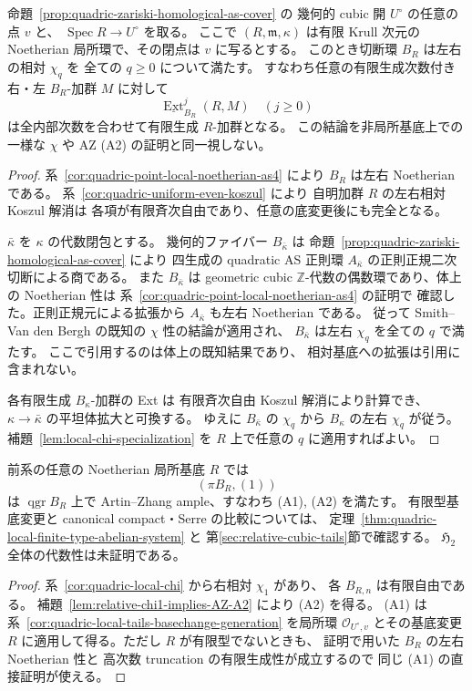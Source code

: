 \begin{corollary}
\label{cor:quadric-local-chi}
命題~\ref{prop:quadric-zariski-homological-as-cover} の
幾何的 cubic 開 $U^\circ$ の任意の点 $v$ と、
$\operatorname{Spec}R\to U^\circ$ を取る。
ここで $(R,\mathfrak m,\kappa)$ は有限 Krull 次元の
Noetherian 局所環で、その閉点は $v$ に写るとする。
このとき切断環 $B_R$ は左右の相対 $\chi_q$ を
全ての $q\ge0$ について満たす。
すなわち任意の有限生成次数付き右・左 $B_R$-加群
$M$ に対して
\[
 \underline{\operatorname{Ext}}_{B_R}^j(R,M)
 \quad(j\ge0)
\]
は全内部次数を合わせて有限生成 $R$-加群となる。
この結論を非局所基底上での一様な
$\chi$ や AZ (A2) の証明と同一視しない。
\end{corollary}
\begin{proof}
系~\ref{cor:quadric-point-local-noetherian-as4} により
$B_R$ は左右 Noetherian である。
系~\ref{cor:quadric-uniform-even-koszul} により
自明加群 $R$ の左右相対 Koszul 解消は
各項が有限斉次自由であり、任意の底変更後にも完全となる。

$\bar\kappa$ を $\kappa$ の代数閉包とする。
幾何的ファイバー $B_{\bar\kappa}$ は
命題~\ref{prop:quadric-zariski-homological-as-cover} により
四生成の quadratic AS 正則環
$A_{\bar\kappa}$ の正則正規二次切断による商である。
また $B_{\bar\kappa}$ は geometric cubic
$\mathbb Z$-代数の偶数環であり、体上の Noetherian 性は
系~\ref{cor:quadric-point-local-noetherian-as4} の証明で
確認した。正則正規元による拡張から
$A_{\bar\kappa}$ も左右 Noetherian である。
従って Smith--Van den Bergh
\cite[\S2.8]{SVdB2013}
の既知の $\chi$ 性の結論が適用され、
$B_{\bar\kappa}$ は左右 $\chi_q$ を全ての $q$ で満たす。
ここで引用するのは体上の既知結果であり、
相対基底への拡張は引用に含まれない。

各有限生成 $B_\kappa$-加群の Ext は
有限斉次自由 Koszul 解消により計算でき、
$\kappa\to\bar\kappa$ の平坦体拡大と可換する。
ゆえに $B_{\bar\kappa}$ の $\chi_q$ から
$B_\kappa$ の左右 $\chi_q$ が従う。
補題~\ref{lem:local-chi-specialization} を
$R$ 上で任意の $q$ に適用すればよい。
\end{proof}

\begin{corollary}
\label{cor:quadric-local-AZ-ampleness}
前系の任意の Noetherian 局所基底 $R$ では
\[
 (\pi B_R,(1))
\]
は $\operatorname{qgr}B_R$ 上で
Artin--Zhang ample、すなわち (A1), (A2) を満たす。
有限型基底変更と canonical compact・Serre の比較については、
定理~\ref{thm:quadric-local-finite-type-abelian-system} と
第\ref{sec:relative-cubic-tails}節で確認する。
$\mathfrak H_2$ 全体の代数性は未証明である。
\end{corollary}
\begin{proof}
系~\ref{cor:quadric-local-chi} から右相対 $\chi_1$ があり、
各 $B_{R,n}$ は有限自由である。
補題~\ref{lem:relative-chi1-implies-AZ-A2} により (A2) を得る。
(A1) は系~\ref{cor:quadric-local-tails-basechange-generation}
を局所環 $\mathcal O_{U^\circ,v}$ とその基底変更 $R$
に適用して得る。ただし $R$ が有限型でないときも、
証明で用いた $B_R$ の左右 Noetherian 性と
高次数 truncation の有限生成性が成立するので
同じ (A1) の直接証明が使える。
\end{proof}

